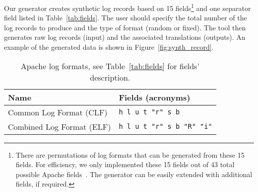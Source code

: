 \documentclass{article}
\begin{document}
Our generator creates synthetic log records based on 15 fields\footnote{There are  permutations of log formats that can be generated from these 15 fields. For efficiency, we only implemented these 15 fields out of 43 total possible Apache fields~\cite{apachemodlog:online}. The generator can be easily extended with additional fields, if required. } and one separator field listed in Table~\ref{tab:fields}. The user should specify the total number of the log records to produce and the type of format (random or fixed). 
The tool then generates raw log records (input) and the associated translations (outputs). An example of the generated data is shown in Figure~\ref{fig:synth_record}.

\begin{table}[bt]
\caption{ Apache log formats, see Table~\ref{tab:fields} for fields' description.}
\label{tab:formats}
\centering
\begin{tabular}{@{}ll@{}}
\toprule
Name                             & Fields (acronyms)       \\ 
\midrule
Common Log Format (CLF)          & \texttt{h l u t "r" s b}         \\
Combined Log Format (ELF) & \texttt{h l u t "r" s b "R" "i"} \\ 
\bottomrule
\end{tabular}
\end{table}
\end{document}
